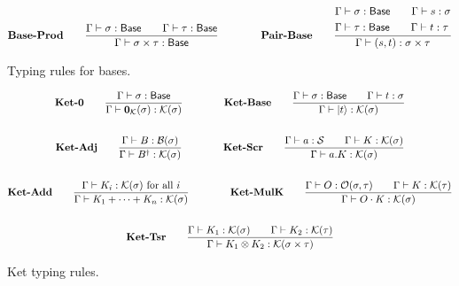 \documentclass{article}
\begin{document}
\begin{figure}[h]
    \begin{gather*}
        \textbf{Base-Prod} \qquad
        \frac{\Gamma\vdash \sigma : \mathsf{Base} \qquad \Gamma\vdash \tau : \mathsf{Base}}{\Gamma\vdash \sigma \times \tau : \mathsf{Base}}
        \qquad \qquad
        \textbf{Pair-Base} \qquad
        \frac{
            \begin{aligned}
                & \Gamma\vdash \sigma : \mathsf{Base} \qquad \Gamma\vdash s : \sigma \\
                & \Gamma\vdash \tau : \mathsf{Base} \qquad \Gamma\vdash t : \tau
            \end{aligned}} {\Gamma\vdash (s, t) : \sigma \times \tau} 
        \textbf{}
    \end{gather*}
    \caption{Typing rules for bases. }
\end{figure}


\begin{figure}[h]
    \begin{gather*}
        \textbf{Ket-0} \qquad
        \frac{\Gamma \vdash \sigma : \mathsf{Base}}{\Gamma \vdash \mathbf{0}_\mathcal{K}(\sigma) : \mathcal{K}(\sigma)} 
        \qquad \qquad
        \textbf{Ket-Base} \qquad
        \frac{\Gamma \vdash \sigma : \mathsf{Base} \qquad \Gamma\vdash t : \sigma}{\Gamma \vdash \ket{t} : \mathcal{K}(\sigma)} \\
        \\
        \textbf{Ket-Adj} \qquad
        \frac{\Gamma \vdash B : \mathcal{B}(\sigma)}{\Gamma \vdash B^\dagger : \mathcal{K}(\sigma)} 
        \qquad \qquad
        \textbf{Ket-Scr} \qquad
        \frac{\Gamma \vdash a : \mathcal{S} \qquad \Gamma \vdash K : \mathcal{K}(\sigma)}{\Gamma \vdash a.K : \mathcal{K}(\sigma)} \\
        \\
        \textbf{Ket-Add} \qquad
        \frac{\Gamma \vdash K_i : \mathcal{K}(\sigma) \text{ for all $i$}}{\Gamma \vdash K_1 + \cdots + K_n : \mathcal{K}(\sigma)}
        \qquad \qquad
        \textbf{Ket-MulK} \qquad
        \frac{\Gamma \vdash O : \mathcal{O}(\sigma, \tau) \qquad \Gamma \vdash K : \mathcal{K}(\tau)}{\Gamma \vdash O \cdot K : \mathcal{K}(\sigma)} \\
        \\
        \textbf{Ket-Tsr} \qquad
        \frac{\Gamma \vdash K_1 : \mathcal{K}(\sigma) \qquad \Gamma \vdash K_2 : \mathcal{K}(\tau)} {\Gamma \vdash K_1 \otimes K_2 : \mathcal{K}(\sigma \times \tau)}
    \end{gather*}
    \caption{Ket typing rules.}
\end{figure}
\end{document}

